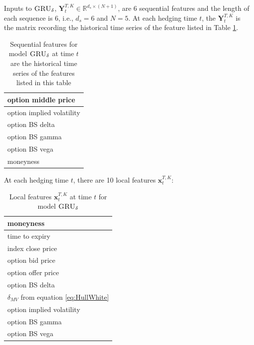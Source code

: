 \documentclass[letterpaper,12pt,titlepage,oneside,final]{book}
\numberwithin{equation}{section}
\theoremstyle{definition}
\newcommand{\model}{\textsc{GRU}_\delta}
\newcommand{\vx}{\mathbf{x}}
\newcommand{\Real}{\mathbb{R}}
\begin{document}
Inputs to $\model$, $\mathbf{Y}_{t}^{T,K} \in \Real^{d_s \times (N+1)}$, are  6  sequential features and the length of each sequence is 6, i.e., $d_s=6$ and $N=5$. At each hedging time $t$, the $\mathbf{Y}_{t}^{T,K}$ is  the matrix recording the historical time series of the feature listed in Table \ref{table:SeqForLocal}.
\begin{table}[htp!]
	\centering
	\begin{tabular}{|l|}
		\hline
		option middle price\\ \hline
		option implied volatility\\ 
		\hline
		option BS delta\\
		\hline
		option BS gamma\\
		\hline
		option BS vega\\
		\hline
		moneyness\\
		\hline
	\end{tabular}
	\label{table:SeqForLocal}
	\caption{Sequential features for model $\model$ at time $t$ are the historical time series of the features listed in this table}
\end{table}
At each hedging time $t$, there are 10 local features  $\vx_{t}^{T,K}$:
\begin{table}[htp!]
	\centering
	\begin{tabular}{|l|}
		\hline
		moneyness \\ \hline
		time to expiry\\ \hline
		index close price\\ \hline
		option bid price\\ \hline
		option offer price\\ \hline
		option BS delta\\ \hline
		$\delta_{MV}$ from equation \eqref{eq:HullWhite} \\ \hline
		option implied volatility\\ \hline
		option BS gamma\\ \hline
		option BS vega\\ \hline
	\end{tabular}
	\caption{Local features  $\vx_{t}^{T,K}$ at time $t$ for model $\model$}
\end{table}
\end{document}
